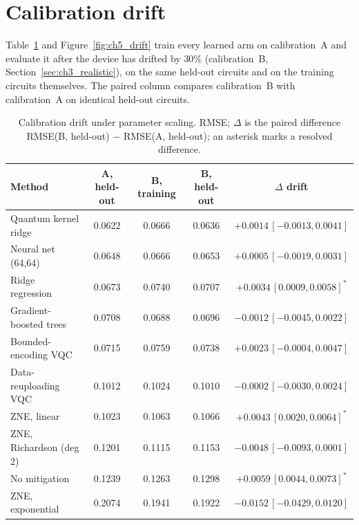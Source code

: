 \documentclass[Thesis.tex]{subfiles}
\begin{document}
\section{Calibration drift}\label{sec:ch5_drift}

Table~\ref{tab:ch5_drift} and Figure~\ref{fig:ch5_drift} train every learned arm on
calibration~A and evaluate it after the device has drifted by $30\%$
(calibration~B, Section~\ref{sec:ch3_realistic}), on the same held-out circuits and
on the training circuits themselves. The paired column compares calibration~B with
calibration~A on identical held-out circuits.

\begin{table}[htbp]
\centering
\caption[Calibration drift under parameter scaling]{Calibration drift under parameter scaling. RMSE; $\Delta$ is the paired
difference RMSE(B, held-out) $-$ RMSE(A, held-out); an asterisk marks a resolved
difference.}
\label{tab:ch5_drift}
\small
\setlength{\tabcolsep}{4pt}
\begin{tabular}{lcccc}
\toprule
\textbf{Method} & \textbf{A, held-out} & \textbf{B, training} & \textbf{B, held-out}
& \textbf{$\Delta$ drift} \\
\midrule
Quantum kernel ridge    & 0.0622 & 0.0666 & 0.0636 & $+0.0014\,[-0.0013, 0.0041]$ \\
Neural net (64,64)      & 0.0648 & 0.0666 & 0.0653 & $+0.0005\,[-0.0019, 0.0031]$ \\
Ridge regression        & 0.0673 & 0.0740 & 0.0707 & $+0.0034\,[0.0009, 0.0058]^{*}$ \\
Gradient-boosted trees  & 0.0708 & 0.0688 & 0.0696 & $-0.0012\,[-0.0045, 0.0022]$ \\
Bounded-encoding VQC    & 0.0715 & 0.0759 & 0.0738 & $+0.0023\,[-0.0004, 0.0047]$ \\
Data-reuploading VQC    & 0.1012 & 0.1024 & 0.1010 & $-0.0002\,[-0.0030, 0.0024]$ \\
ZNE, linear             & 0.1023 & 0.1063 & 0.1066 & $+0.0043\,[0.0020, 0.0064]^{*}$ \\
ZNE, Richardson (deg 2) & 0.1201 & 0.1115 & 0.1153 & $-0.0048\,[-0.0093, 0.0001]$ \\
No mitigation           & 0.1239 & 0.1263 & 0.1298 & $+0.0059\,[0.0044, 0.0073]^{*}$ \\
ZNE, exponential        & 0.2074 & 0.1941 & 0.1922 & $-0.0152\,[-0.0429, 0.0120]$ \\
\bottomrule
\end{tabular}
\end{table}
\end{document}
